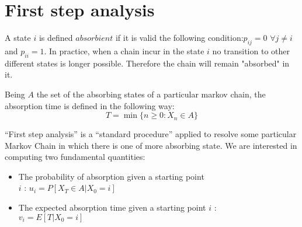 \section{First step analysis}
\begin{definition}
	 A state $i$ is defined $absorbient$ if it is valid the following condition:$p_{ij}=0$ $\forall j\neq i$ and $p_{ii}=1$. In practice, when a chain incur in the state $i$ no transition to other different states is longer possible. Therefore  the chain will remain "absorbed" in it.
\end{definition}
\begin{definition}
	Being $A$ the set of the absorbing states of a particular markov chain, the absorption time is defined in the following way:
	\begin{equation}
	T= \min \{n\geq0: X_n \in A \}
	\end{equation}
\end{definition}
``First step analysis'' is a ``standard procedure'' applied to resolve some particular Markov Chain in which there is one of more absorbing state.
 We are interested in computing two fundamental quantities:
\begin{itemize}
	\item The probability of absorption given a starting point \\$i$ :  $ u_i=P[X_T\in A | X_0=i ]$
	\item The expected absorption time given a starting point $i$ :\\ $v_i= E[T|X_0=i]$
\end{itemize}
